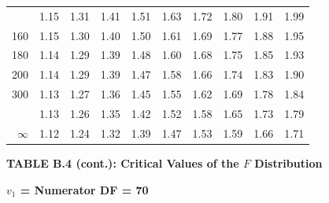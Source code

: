 \documentclass[10pt]{article}
\begin{document}
\begin{longtable}{@{}r!{\vrule width 0.8pt\hspace{0.55em}}rrrrrrrrr@{}}
 & 1.15 & 1.31 & 1.41 & 1.51 & 1.63 & 1.72 & 1.80 & 1.91 & 1.99 \\
160 & 1.15 & 1.30 & 1.40 & 1.50 & 1.61 & 1.69 & 1.77 & 1.88 & 1.95 \\
180 & 1.14 & 1.29 & 1.39 & 1.48 & 1.60 & 1.68 & 1.75 & 1.85 & 1.93 \\
200 & 1.14 & 1.29 & 1.39 & 1.47 & 1.58 & 1.66 & 1.74 & 1.83 & 1.90 \\
300 & 1.13 & 1.27 & 1.36 & 1.45 & 1.55 & 1.62 & 1.69 & 1.78 & 1.84 \\
 & 1.13 & 1.26 & 1.35 & 1.42 & 1.52 & 1.58 & 1.65 & 1.73 & 1.79 \\
$\infty$ & 1.12 & 1.24 & 1.32 & 1.39 & 1.47 & 1.53 & 1.59 & 1.66 & 1.71 \\
\end{longtable}
\newpage
\thispagestyle{empty}
\begin{center}
{\large\bfseries TABLE B.4 (cont.): Critical Values of the $F$ Distribution\par}
\end{center}
{\large\bfseries $v_1$ = Numerator DF = 70\par}
\vspace{0.5em}
\small
\end{document}
